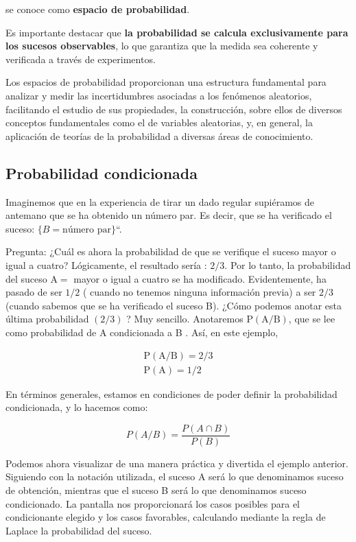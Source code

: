 \documentclass[
]{article}
\begin{document}
se conoce como \textbf{espacio de probabilidad}.

Es importante destacar que \textbf{la probabilidad se calcula exclusivamente para los sucesos observables}, lo que garantiza que la medida sea coherente y verificada a través de experimentos.

Los espacios de probabilidad proporcionan una estructura fundamental para analizar y medir las incertidumbres asociadas a los fenómenos aleatorios, facilitando el estudio de sus propiedades, la construcción, sobre ellos de diversos conceptos fundamentales como el de variables aleatorias, y, en general, la aplicación de teorías de la probabilidad a diversas áreas de conocimiento.

\subsection{Probabilidad condicionada}\label{probabilidad-condicionada}

Imaginemos que en la experiencia de tirar un dado regular supiéramos de
antemano que se ha obtenido un número par. Es decir, que se ha
verificado el suceso: \(\{B = \mbox{número par}\}\)``.

Pregunta: ¿Cuál es ahora la probabilidad de que se verifique el suceso
mayor o igual a cuatro? Lógicamente, el resultado sería : \(2 / 3\). Por
lo tanto, la probabilidad del suceso \(\mathrm{A}=\) mayor o igual a
cuatro se ha modificado. Evidentemente, ha pasado de ser \(1 / 2\) (
cuando no tenemos ninguna información previa) a ser \(2 / 3\) (cuando
sabemos que se ha verificado el suceso B). ¿Cómo podemos anotar esta
última probabilidad \((2 / 3)\) ? Muy sencillo. Anotaremos
\(\mathrm{P}(\mathrm{A} / \mathrm{B})\), que se lee como probabilidad de A
condicionada a B . Así, en este ejemplo,

\[
\begin{gathered}
\mathrm{P}(\mathrm{A} / \mathrm{B})=2 / 3 \\
\mathrm{P}(\mathrm{A})=1 / 2
\end{gathered}
\]

En términos generales, estamos en condiciones de poder definir la
probabilidad condicionada, y lo hacemos como:

\[
P(A / B)=\frac{P(A \cap B)}{P(B)}
\]

Podemos ahora visualizar de una manera práctica y divertida el ejemplo
anterior. Siguiendo con la notación utilizada, el suceso A será lo que
denominamos suceso de obtención, mientras que el suceso B será lo que
denominamos suceso condicionado. La pantalla nos proporcionará los casos
posibles para el condicionante elegido y los casos favorables,
calculando mediante la regla de Laplace la probabilidad del suceso.
\end{document}
